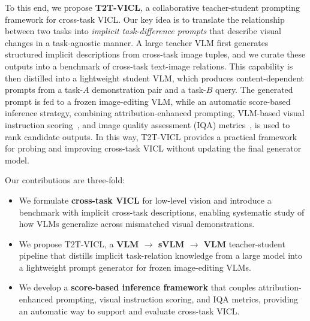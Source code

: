 To this end, we propose \textbf{T2T-VICL}, a collaborative teacher-student prompting framework for cross-task VICL. Our key idea is to translate the relationship between two tasks into \emph{implicit task-difference prompts} that describe visual changes in a task-agnostic manner. A large teacher VLM first generates structured implicit descriptions from cross-task image tuples, and we curate these outputs into a benchmark of cross-task text-image relations. This capability is then distilled into a lightweight student VLM, which produces content-dependent prompts from a task-$A$ demonstration pair and a task-$B$ query. The generated prompt is fed to a frozen image-editing VLM, while an automatic score-based inference strategy, combining attribution-enhanced prompting, VLM-based visual instruction scoring~\cite{ku2023viescore}, and image quality assessment (IQA) metrics~\cite{zhang2012comprehensive}, is used to rank candidate outputs. In this way, T2T-VICL provides a practical framework for probing and improving cross-task VICL without updating the final generator model.

Our contributions are three-fold:
\begin{itemize}[itemsep=-2pt, topsep=1pt]
    \item  We formulate \textbf{cross-task VICL} for low-level vision and introduce a benchmark with implicit cross-task descriptions, enabling systematic study of how VLMs generalize across mismatched visual demonstrations. 
    \item  We propose T2T-VICL, a \textbf{VLM $\rightarrow$ sVLM $\rightarrow$ VLM} teacher-student pipeline that distills implicit task-relation knowledge from a large model into a lightweight prompt generator for frozen image-editing VLMs. 
    \item  We develop a \textbf{score-based inference framework} that couples attribution-enhanced prompting, visual instruction scoring, and IQA metrics, providing an automatic way to support and evaluate cross-task VICL.
\end{itemize}


